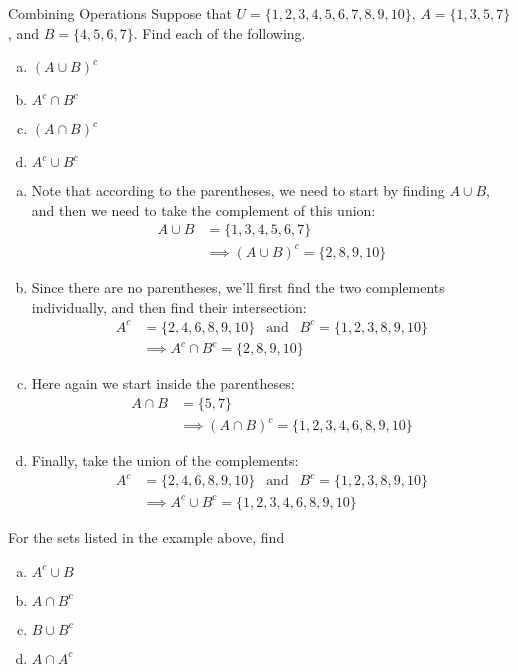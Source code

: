 \begin{example}{Combining Operations}
Suppose that $U = \{1,2,3,4,5,6,7,8,9,10\}$, $A=\{1,3,5,7\}$, and $B=\{4,5,6,7\}$.  Find each of the following.
\begin{enumerate}[(a)]
\item $(A \cup B)^c$
\item $A^c \cap B^c$
\item $(A \cap B)^c$
\item $A^c \cup B^c$
\end{enumerate}

\sol
\begin{enumerate}[(a)]
\item Note that according to the parentheses, we need to start by finding $A \cup B$, and then we need to take the complement of this union:
\begin{align*}
A \cup B &= \{1,3,4,5,6,7\}\\
&\implies \boxed{(A \cup B)^c = \{2,8,9,10\}}
\end{align*}

\item Since there are no parentheses, we'll first find the two complements individually, and then find their intersection:
\begin{align*}
A^c &= \{2,4,6,8,9,10\} \ \ \textrm{ and } \ \ B^c = \{1,2,3,8,9,10\}\\
&\implies \boxed{A^c \cap B^c = \{2,8,9,10\}}
\end{align*}

\item Here again we start inside the parentheses:
\begin{align*}
A \cap B &= \{5,7\}\\
&\implies \boxed{(A \cap B)^c = \{1,2,3,4,6,8,9,10\}}
\end{align*}

\item Finally, take the union of the complements:
\begin{align*}
A^c &= \{2,4,6,8,9,10\} \ \ \textrm{ and } \ \ B^c = \{1,2,3,8,9,10\}\\
&\implies \boxed{A^c \cup B^c = \{1,2,3,4,6,8,9,10\}}
\end{align*}
\end{enumerate}
\end{example}

\begin{try}
For the sets listed in the example above, find
\begin{enumerate}[(a)]
\item $A^c \cup B$
\item $A \cap B^c$
\item $B \cup B^c$
\item $A \cap A^c$
\end{enumerate}
\end{try}

